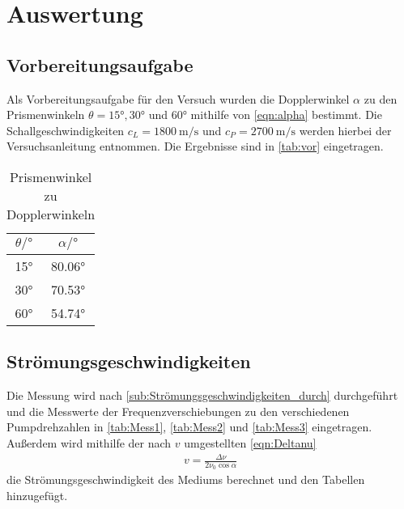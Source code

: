 \section{Auswertung}
\label{sec:Auswertung}

\subsection{Vorbereitungsaufgabe}
Als Vorbereitungsaufgabe für den Versuch wurden die Dopplerwinkel $\alpha$ zu den Prismenwinkeln $\theta = 15° , 30°$ und $60°$
mithilfe von \autoref{eqn:alpha} bestimmt.
Die Schallgeschwindigkeiten $c_L=\qty{1800}{\meter\per\second}$ und $c_P=\qty{2700}{\meter\per\second}$ werden hierbei der Versuchsanleitung
\cite{VUS3} entnommen.
Die Ergebnisse sind in \autoref{tab:vor} eingetragen.

\begin{table}
    \centering
    \caption{Prismenwinkel zu Dopplerwinkeln}
    \begin{tabular}{S[table-format=2.0] S[table-format=2.0]}
        \toprule
        {$\theta / \si{\degree}$} & {$\alpha  / \si{\degree}$}  \\
        ° & 80.06°  \\
        30° & 70.53°  \\
        60° & 54.74°  \\
        \bottomrule
    \end{tabular}
    \label{tab:vor}
\end{table}

\subsection{Strömungsgeschwindigkeiten}
\label{sub:Strömungsgeschwindigkeiten}

Die Messung wird nach \autoref{sub:Strömungsgeschwindigkeiten_durch} durchgeführt und die Messwerte der Frequenzverschiebungen
zu den verschiedenen Pumpdrehzahlen in \autoref{tab:Mess1}, \autoref{tab:Mess2} und \autoref{tab:Mess3} eingetragen.
Außerdem wird mithilfe der nach $v$ umgestellten \autoref{eqn:Deltanu}
\begin{align}
  v= \frac{\Delta \nu}{2 \nu_0 \cos{\alpha}} \label{eqn:v}
\end{align}
die Strömungsgeschwindigkeit des Mediums berechnet und den Tabellen hinzugefügt. 

